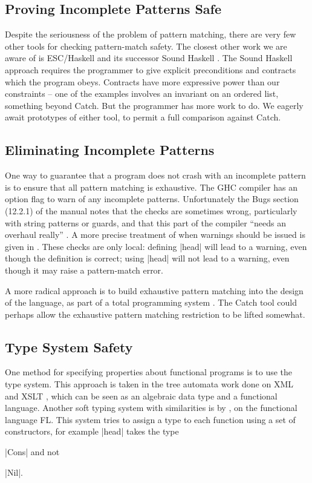 \subsection{Proving Incomplete Patterns Safe}

Despite the seriousness of the problem of pattern matching, there are very few other tools for checking pattern-match safety. The closest other work we are aware of is ESC/Haskell \cite{esc_haskell} and its successor Sound Haskell \cite{xu:sound_haskell}. The Sound Haskell approach requires the programmer to give explicit preconditions and contracts which the program obeys. Contracts have more expressive power than our constraints -- one of the examples involves an invariant on an ordered list, something beyond Catch. But the programmer has more work to do. We eagerly await prototypes of either tool, to permit a full comparison against Catch.

\subsection{Eliminating Incomplete Patterns}

One way to guarantee that a program does not crash with an incomplete pattern is to ensure that all pattern matching is exhaustive. The GHC compiler \cite{ghc} has an option flag to warn of any incomplete patterns. Unfortunately the Bugs section (12.2.1) of the manual notes that the checks are sometimes wrong, particularly with string patterns or guards, and that this part of the compiler ``needs an overhaul really'' \cite{ghc}. A more precise treatment of when warnings should be issued is given in \citet{maranget:pattern_warnings}. These checks are only local: defining |head| will lead to a warning, even though the definition is correct; using |head| will not lead to a warning, even though it may raise a pattern-match error.

A more radical approach is to build exhaustive pattern matching into the design of the language, as part of a total programming system \cite{turner:total}. The Catch tool could perhaps allow the exhaustive pattern matching restriction to be lifted somewhat.


\subsection{Type System Safety}

One method for specifying properties about functional programs is to use the type system. This approach is taken in the tree automata work done on XML and XSLT \cite{static_xslt}, which can be seen as an algebraic data type and a functional language. Another soft typing system with similarities is by \citet{aiken:type_infer}, on the functional language FL. This system tries to assign a type to each function using a set of constructors, for example |head| takes the type \ignore|Cons| and not \ignore|Nil|.


